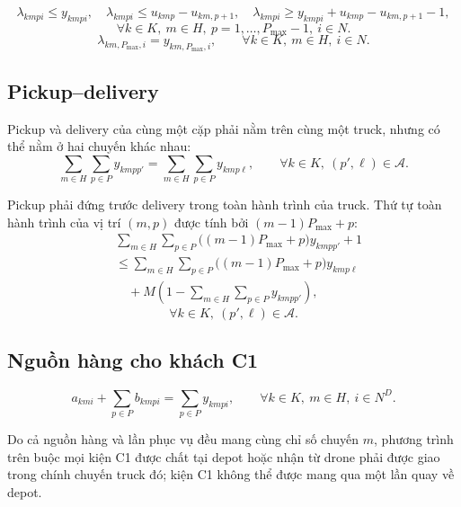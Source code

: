 \documentclass[12pt,a4paper]{article}
\begin{document}
\begin{equation}
  \lambda_{kmpi}\le y_{kmpi},\quad
  \lambda_{kmpi}\le u_{kmp}-u_{km,p+1},\quad
  \lambda_{kmpi}\ge y_{kmpi}+u_{kmp}-u_{km,p+1}-1,
\end{equation}
\[
  \forall k\in K,\ m\in H,\ p=1,\ldots,P_{\max}-1,\ i\in N.
\]
\begin{equation}
  \lambda_{km,P_{\max},i}=y_{km,P_{\max},i},
  \qquad \forall k\in K,\ m\in H,\ i\in N.
\end{equation}

\subsection{Pickup--delivery}

Pickup và delivery của cùng một cặp phải nằm trên cùng một truck, nhưng có thể nằm
ở hai chuyến khác nhau:
\begin{equation}
  \sum_{m\in H}\sum_{p\in P}y_{kmp p'}
  =
  \sum_{m\in H}\sum_{p\in P}y_{kmp \ell},
  \qquad \forall k\in K,\ (p',\ell)\in\mathcal A.
\end{equation}

Pickup phải đứng trước delivery trong toàn hành trình của truck. Thứ tự toàn hành
trình của vị trí \((m,p)\) được tính bởi \((m-1)P_{\max}+p\):
\begin{equation}
\begin{aligned}
  &\sum_{m\in H}\sum_{p\in P}\big((m-1)P_{\max}+p\big)y_{kmp p'}+1\\
  &\le
  \sum_{m\in H}\sum_{p\in P}\big((m-1)P_{\max}+p\big)y_{kmp\ell}\\
  &\quad +M\left(1-\sum_{m\in H}\sum_{p\in P}y_{kmp p'}\right),
\end{aligned}
\end{equation}
\[
  \forall k\in K,\ (p',\ell)\in\mathcal A.
\]

\subsection{Nguồn hàng cho khách C1}

\begin{equation}
  a_{kmi}+\sum_{p\in P}b_{kmpi}
  =
  \sum_{p\in P}y_{kmpi},
  \qquad \forall k\in K,\ m\in H,\ i\in N^D.
\end{equation}

Do cả nguồn hàng và lần phục vụ đều mang cùng chỉ số chuyến \(m\), phương trình trên
buộc mọi kiện C1 được chất tại depot hoặc nhận từ drone phải được giao trong chính
chuyến truck đó; kiện C1 không thể được mang qua một lần quay về depot.
\end{document}
